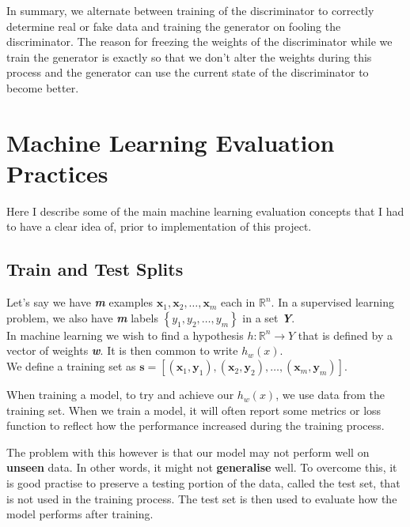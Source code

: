 \documentclass[12pt,a4paper,twoside]{report}
\begin{document}
In summary, we alternate between training of the discriminator to correctly determine real or fake data and training the generator on fooling the discriminator. The reason for freezing the weights of the discriminator while we train the generator is exactly so that we don't alter the weights during this process and the generator can use the current state of the discriminator to become better.

\section{Machine Learning Evaluation Practices}
Here I describe some of the main machine learning evaluation concepts that I had to have a clear idea of, prior to implementation of this project. 

\subsection{Train and Test Splits}
Let's say we have \textbf{\textit{m}} examples $ \mathbf { x } _ { 1} ,\mathbf { x } _ { 2} ,\dots ,\mathbf { x } _ { m }$ each in $\mathbb { R } ^ { n }$. In a supervised learning problem, we also have \textbf{\textit{m}} labels $\left\{ y _ { 1} ,y _ { 2} ,\dots ,y _ { m } \right\}$ in a set \textbf{\textit{Y}}.\\
In machine learning we wish to find a hypothesis $h : \mathbb { R } ^ { n } \rightarrow Y$ that is defined by a vector of weights \textbf{\textit{w}}. It is then common to write $h _ { w } ( x )$.\\

We define a training set as $\mathbf{s} = [(\mathbf { x } _ { 1}, \mathbf { y } _ { 1}),(\mathbf { x } _ { 2}, \mathbf { y } _ { 2}),\dots,(\mathbf { x } _ { m}, \mathbf { y } _ { m})]$.
 
When training a model, to try and achieve our $h _ { w } ( x )$, we use data from the training set. When we train a model, it will often report some metrics or loss function to reflect how the performance increased during the training process. 

The problem with this however is that our model may not perform well on \textbf{unseen} data. In other words, it might not \textbf{generalise} well. To overcome this, it is good practise to preserve a testing portion of the data, called the test set, that is not used in the training process. The test set is then used to evaluate how the model performs after training. 
\end{document}
